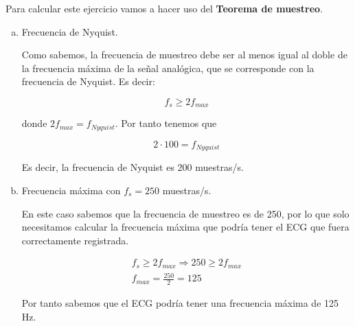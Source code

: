\documentclass[11pt,a4paper]{article}
\begin{document}
Para calcular este ejercicio vamos a hacer uso del \textbf{Teorema de muestreo}.

\begin{enumerate}[a)]
	\item Frecuencia de Nyquist.

	Como sabemos, la frecuencia de muestreo debe ser al menos igual al doble de la frecuencia máxima de la señal analógica, que se corresponde con la frecuencia de Nyquist. Es decir:
	
	\[f_s \geq 2f_{max}\]
	
	donde $2f_{max} = f_{Nyquist}$. Por tanto tenemos que
	
	\[2\cdot 100 = f_{Nyquist}\]
	
	Es decir, la frecuencia de Nyquist es 200 muestras/s.
		
	\item Frecuencia máxima con $f_s = 250$ muestras/s.
	
	En este caso sabemos que la frecuencia de muestreo es de 250, por lo que solo necesitamos calcular la frecuencia máxima que podría tener el ECG que fuera correctamente registrada.
	
	\begin{gather*}
	f_s \geq 2f_{max} \Rightarrow 250 \geq 2f_{max}\\
	f_{max} = \frac{250}{2} = 125
	\end{gather*}
	
	Por tanto sabemos que el ECG podría tener una frecuencia máxima de 125 Hz.
\end{enumerate}
\end{document}
